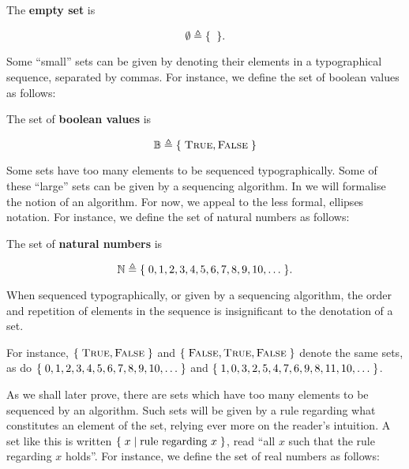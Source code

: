
\begin{definition} The \textbf{empty set} is

$$\emptyset\triangleq\mathopen{}\left\{\mathrel{}{}\mathrel{}\right\}\mathclose{}.$$

\end{definition}

Some ``small'' sets can be given by denoting their elements in a typographical
sequence, separated by commas. For instance, we define the set of boolean
values as follows:

\begin{definition} The set of \textbf{boolean values} is

$$\mathbb{B}\triangleq\mathopen{}\left\{\mathrel{}{\text{\textsc{True}},\text{\textsc{False}}}\mathrel{}\right\}\mathclose{}$$

\end{definition}

Some sets have too many elements to be sequenced typographically. Some of these
``large'' sets can be given by a sequencing algorithm. In
 we will formalise the notion of an
algorithm. For now, we appeal to the less formal, ellipses notation. For
instance, we define the set of natural numbers as follows:

\begin{definition} The set of \textbf{natural numbers} is

$$\mathbb{N} \triangleq \mathopen{}\left\{\mathrel{}{0,1,2,3,4,5,6,7,8,9,10,\ldots}\mathrel{}\right\}\mathclose{}.$$

\end{definition}

\begin{remark} When sequenced typographically, or given by a sequencing
algorithm, the order and repetition of elements in the sequence is
insignificant to the denotation of a set. \end{remark}

For instance, $\mathopen{}\left\{\mathrel{}{\text{\textsc{True}},\text{\textsc{False}}}\mathrel{}\right\}\mathclose{}$ and $\mathopen{}\left\{\mathrel{}{\text{\textsc{False}}, \text{\textsc{True}}, \text{\textsc{False}}}\mathrel{}\right\}\mathclose{}$
denote the same sets, as do $\mathopen{}\left\{\mathrel{}{0,1,2,3,4,5,6,7,8,9,10,\ldots}\mathrel{}\right\}\mathclose{}$ and
$\mathopen{}\left\{\mathrel{}{1,0,3,2,5,4,7,6,9,8,11,10,\ldots}\mathrel{}\right\}\mathclose{}$.

As we shall later prove, there are sets which have too many elements to be
sequenced by an algorithm.  Such sets will be given by a rule regarding what
constitutes an element of the set, relying ever more on the reader's intuition.
A set like this is written $\mathopen{}\left\{\mathrel{}{x\mathrel{}\mid\mathrel{}{\text{rule regarding $x$}}}\mathrel{}\right\}\mathclose{}$, read ``all
$x$ such that the rule regarding $x$ holds''. For instance, we define the set
of real numbers as follows:

